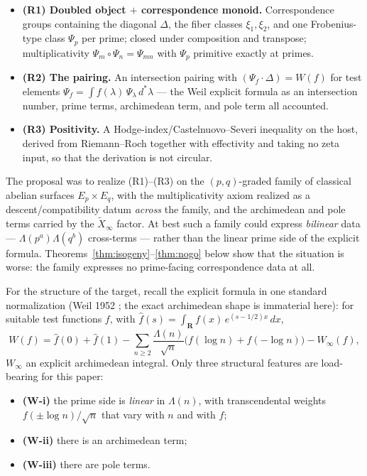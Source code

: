 \documentclass[11pt]{article}
\theoremstyle{definition}
\theoremstyle{remark}
\newcommand{\R}{\mathbf{R}}
\begin{document}
\begin{itemize}
\item \textbf{(R1) Doubled object $+$ correspondence monoid.} Correspondence
groups containing the diagonal $\Delta$, the fiber classes $\xi_1, \xi_2$,
and one Frobenius-type class $\Psi_p$ per prime; closed under composition and
transpose; multiplicativity $\Psi_m \circ \Psi_n = \Psi_{mn}$ with $\Psi_p$
primitive exactly at primes.
\item \textbf{(R2) The pairing.} An intersection pairing with
$(\Psi_f \cdot \Delta) = W(f)$ for test elements
$\Psi_f = \int f(\lambda)\, \Psi_\lambda \, d^*\lambda$ --- the Weil explicit
formula as an intersection number, prime terms, archimedean term, and pole
term all accounted.
\item \textbf{(R3) Positivity.} A Hodge-index/Castelnuovo--Severi inequality
on the host, derived from Riemann--Roch together with effectivity and taking
no zeta input, so that the derivation is not circular.
\end{itemize}

The proposal was to realize (R1)--(R3) on the $(p,q)$-graded family of
classical abelian surfaces $E_p \times E_q$, with the multiplicativity axiom
realized as a descent/compatibility datum \emph{across} the family, and the
archimedean and pole terms carried by the $\widetilde{X}_\infty$
factor. At best such a family could express \emph{bilinear} data ---
$\Lambda(p^a)\Lambda(q^b)$ cross-terms --- rather than the linear prime side
of the explicit formula. Theorems~\ref{thm:isogeny}--\ref{thm:nogo}
below show that the situation is worse: the family expresses no
prime-facing correspondence data at all.

For the structure of the target, recall the explicit formula in one standard
normalization (Weil 1952 \cite{We52}; the exact archimedean shape is
immaterial here): for suitable test functions $f$, with
$\hat{f}(s) = \int_{\R} f(x)\, e^{(s-1/2)x}\, dx$,
\[
W(f) = \hat{f}(0) + \hat{f}(1)
 - \sum_{n\geq 2} \frac{\Lambda(n)}{\sqrt{n}}\bigl(f(\log n) + f(-\log n)\bigr)
 - W_\infty(f) ,
\]
$W_\infty$ an explicit archimedean integral. Only three structural features
are load-bearing for this paper:

\begin{itemize}
\item \textbf{(W-i)} the prime side is \emph{linear} in $\Lambda(n)$, with
transcendental weights $f(\pm\log n)/\sqrt{n}$ that vary with $n$ and with
$f$;
\item \textbf{(W-ii)} there is an archimedean term;
\item \textbf{(W-iii)} there are pole terms.
\end{itemize}
\end{document}
